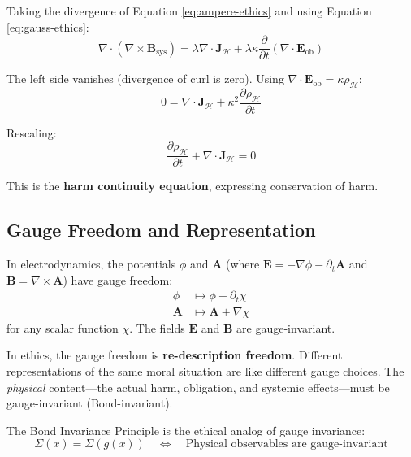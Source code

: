 \documentclass[12pt,letterpaper]{article}
\theoremstyle{definition}
\theoremstyle{remark}
\newcommand{\harm}{\mathcal{H}}
\begin{document}
Taking the divergence of Equation \ref{eq:ampere-ethics} and using Equation \ref{eq:gauss-ethics}:
\begin{equation}
\nabla \cdot (\nabla \times \mathbf{B}_\text{sys}) = \lambda \nabla \cdot \mathbf{J}_\harm + \lambda \kappa \frac{\partial}{\partial t}(\nabla \cdot \mathbf{E}_\text{ob})
\end{equation}

The left side vanishes (divergence of curl is zero). Using $\nabla \cdot \mathbf{E}_\text{ob} = \kappa \rho_\harm$:
\begin{equation}
0 = \nabla \cdot \mathbf{J}_\harm + \kappa^2 \frac{\partial \rho_\harm}{\partial t}
\end{equation}

Rescaling:
\begin{equation}
\boxed{\frac{\partial \rho_\harm}{\partial t} + \nabla \cdot \mathbf{J}_\harm = 0}
\end{equation}

This is the \textbf{harm continuity equation}, expressing conservation of harm.

\subsection{Gauge Freedom and Representation}

In electrodynamics, the potentials $\phi$ and $\mathbf{A}$ (where $\mathbf{E} = -\nabla \phi - \partial_t \mathbf{A}$ and $\mathbf{B} = \nabla \times \mathbf{A}$) have gauge freedom:
\begin{align}
\phi &\mapsto \phi - \partial_t \chi \\
\mathbf{A} &\mapsto \mathbf{A} + \nabla \chi
\end{align}
for any scalar function $\chi$. The fields $\mathbf{E}$ and $\mathbf{B}$ are gauge-invariant.

In ethics, the gauge freedom is \textbf{re-description freedom}. Different representations of the same moral situation are like different gauge choices. The \textit{physical} content---the actual harm, obligation, and systemic effects---must be gauge-invariant (Bond-invariant).

The Bond Invariance Principle is the ethical analog of gauge invariance:
\begin{equation}
\Sigma(x) = \Sigma(g(x)) \quad \Longleftrightarrow \quad \text{Physical observables are gauge-invariant}
\end{equation}

\end{document}
